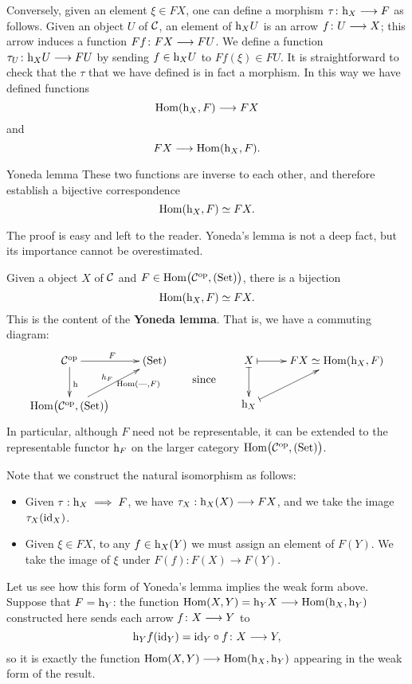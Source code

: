 \begin{2   CONTRAVARIANT FUNCTORS}
\begin{2.1 Yoneda Lemma}
Conversely, given an element $\xi\in F X$, one can define a morphism $\tau\colon \h_X \arr F$ as follows. Given an object $U$ of $\mathcal{C}$, an element of $\mathrm{h}_X U$ is an arrow $f\colon U \arr X$; this arrow induces a function $F f \colon F X \arr F U$. We define a function $\tau_{U} \colon \h_X U \arr F U$ by sending $f \in \mathrm{h}_X U$ to $F f(\xi) \in F U$. It is straightforward to check that the $\tau$ that we have defined is in fact a morphism. In this way we have defined functions
   \[
   \hom(\h_X,F) \arr F X
   \]
and
   \[
   F X \arr \hom(\h_X,F).
   \]

\begin{named}{Yoneda lemma}
These two functions are inverse to each other, and therefore establish a bijective correspondence
   \[
   \operatorname{Hom}(\mathrm{h}_X,F) \simeq F X.
   \]
\end{named}

The proof is easy and left to the reader. Yoneda's lemma is not a deep fact, but its importance cannot be overestimated.
\begin{shaded}
Given a object $X$ of $\mathcal{C}$ and $F\in\mathrm{Hom}\bigl(\mathcal{C}^{\mathrm{op}}, (\mathrm{Set})\bigr)$, there is a bijection
\[\operatorname{Hom}(\mathrm{h}_X,F)\simeq FX.\]
This is the content of the \textbf{Yoneda lemma}. That is, we have a commuting diagram:
\[\xymatrix{
\ar[d]^{\h}\calC\op\ar[r]^F&\catset\\
\func{\calC}\ar[ur]^{h_F}_(.65){\hom(\DASH,F)}&
}\raisebox{-6mm}{\qquad since\qquad }
\xymatrix{
\ar@{|->}[d]X\ar@{|->}[r]&FX\simeq\hom(\h_X,F)\\
\h_X\ar@{|->}[ur]
}\]
In particular, although $F$ need not be representable, it can be extended to the representable functor $\mathrm{h}_F$ on the larger category $\mathrm{Hom}\bigl(\mathcal{C}^{\mathrm{op}}, (\mathrm{Set})\bigr)$.

{\small Note that we construct the natural isomorphism as follows:
\begin{itemize}\squishlist
\item Given $\tau:\mathrm{h}_X\implies F$, we have $\tau_X:\mathrm{h}_X(X)\longrightarrow FX$, and we take the image $\tau_X(\mathrm{id}_X)$.
\item Given $\xi\in F X$, to any $f\in \mathrm{h}_X(Y)$ we must assign an element of $F(Y)$. We take the image of $\xi$ under $F(f):F(X)\to F(Y)$.
\end{itemize}}

\end{shaded}

Let us see how this form of Yoneda's lemma implies the weak form above. Suppose that $F = \mathrm{h}_Y$: the function $\hom(X,Y) = \h_Y X \arr \hom(\h_X,\h_Y)$ constructed here sends each arrow $f \colon X \arr Y$ to
   \[
   \h_Y f(\id_Y) = \id_Y \circ f \colon X \arr Y,
   \]
so it is exactly the function $\hom(X,Y) \arr \hom(\h_X,\h_Y)$ appearing in the weak form of the result.


\end{2.1 Yoneda Lemma}
\end{2   CONTRAVARIANT FUNCTORS}
